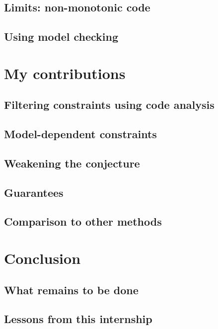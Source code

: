\documentclass[11pt,a4paper,oldfontcommands]{memoir}
\begin{document}
    \section{Limits: non-monotonic code}

    \section{Using model checking}



\chapter{My contributions}

    \section{Filtering constraints using code analysis}


    \section{Model-dependent constraints}

    \section{Weakening the conjecture}


    \section{Guarantees}

    \section{Comparison to other methods}

\chapter{Conclusion}

    \section{What remains to be done}

    \section{Lessons from this internship}



\end{document}
